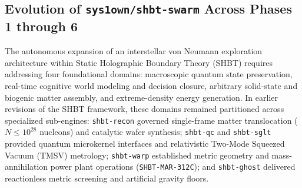 \documentclass[11pt,onecolumn]{article}
\begin{document}
\subsection{Evolution of \texttt{sys1own/shbt-swarm} Across Phases 1 through 6}
The autonomous expansion of an interstellar von Neumann exploration architecture within Static Holographic Boundary Theory (SHBT) requires addressing four foundational domains: macroscopic quantum state preservation, real-time cognitive world modeling and decision closure, arbitrary solid-state and biogenic matter assembly, and extreme-density energy generation. In earlier revisions of the SHBT framework, these domains remained partitioned across specialized sub-engines: \texttt{shbt-recon} governed single-frame matter translocation ($N \le 10^{28}$ nucleons) and catalytic wafer synthesis; \texttt{shbt-qc} and \texttt{shbt-sglt} provided quantum microkernel interfaces and relativistic Two-Mode Squeezed Vacuum (TMSV) metrology; \texttt{shbt-warp} established metric geometry and mass-annihilation power plant operations (\texttt{SHBT-MAR-312C}); and \texttt{shbt-ghost} delivered reactionless metric screening and artificial gravity floors.
\end{document}

